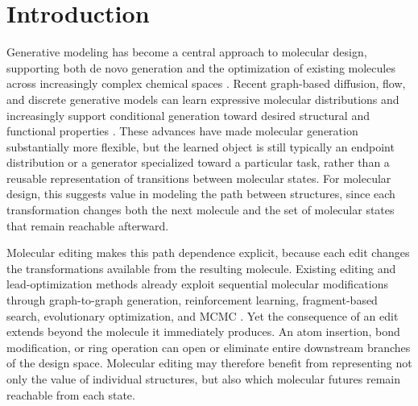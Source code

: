 \section{Introduction}
\label{sec:intro}

Generative modeling has become a central approach to molecular design, supporting both de novo generation and the optimization of existing molecules across increasingly complex chemical spaces \citep{gomezbombarelli2018chemvae,jin2018jtvae,vignac2023digress,lee2025genmol}. Recent graph-based diffusion, flow, and discrete generative models can learn expressive molecular distributions and increasingly support conditional generation toward desired structural and functional properties \citep{vignac2023digress,campbell2024multiflow,lee2025genmol}. These advances have made molecular generation substantially more flexible, but the learned object is still typically an endpoint distribution or a generator specialized toward a particular task, rather than a reusable representation of transitions between molecular states. For molecular design, this suggests value in modeling the path between structures, since each transformation changes both the next molecule and the set of molecular states that remain reachable afterward.

Molecular editing makes this path dependence explicit, because each edit changes the transformations available from the resulting molecule. Existing editing and lead-optimization methods already exploit sequential molecular modifications through graph-to-graph generation, reinforcement learning, fragment-based search, evolutionary optimization, and MCMC \citep{jin2019vjtnn,zhou2019moldqn,jensen2019graphga,xie2021mars,fu2021mimosa}. Yet the consequence of an edit extends beyond the molecule it immediately produces. An atom insertion, bond modification, or ring operation can open or eliminate entire downstream branches of the design space. Molecular editing may therefore benefit from representing not only the value of individual structures, but also which molecular futures remain reachable from each state.

